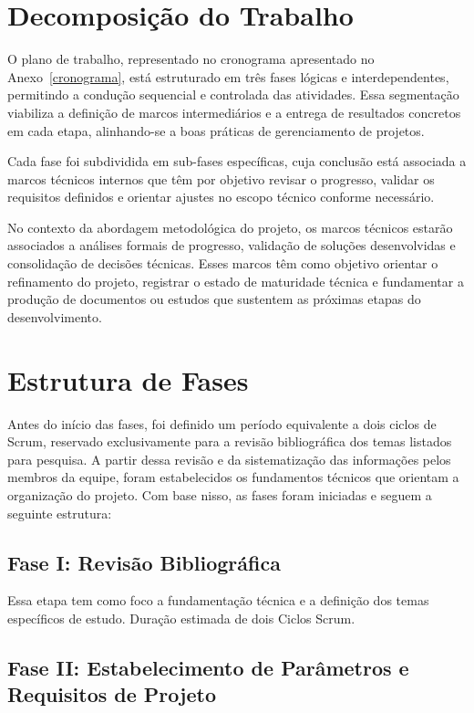 \section{Decomposição do Trabalho}\label{sec:trabalho}
O plano de trabalho, representado no cronograma apresentado no Anexo~\ref{cronograma}, está estruturado em três fases lógicas e interdependentes, permitindo a condução sequencial e controlada das atividades. Essa segmentação viabiliza a definição de marcos intermediários e a entrega de resultados concretos em cada etapa, alinhando-se a boas práticas de gerenciamento de projetos.

Cada fase foi subdividida em sub-fases específicas, cuja conclusão está associada a marcos técnicos internos que têm por objetivo revisar o progresso, validar os requisitos definidos e orientar ajustes no escopo técnico conforme necessário.

No contexto da abordagem metodológica do projeto, os marcos técnicos estarão associados a análises formais de progresso, validação de soluções desenvolvidas e consolidação de decisões técnicas. Esses marcos têm como objetivo orientar o refinamento do projeto, registrar o estado de maturidade técnica e fundamentar a produção de documentos ou estudos que sustentem as próximas etapas do desenvolvimento.


\section{Estrutura de Fases}\label{sec:fases}

Antes do início das fases, foi definido um período equivalente a dois ciclos de Scrum, reservado exclusivamente para a revisão bibliográfica dos temas listados para pesquisa. A partir dessa revisão e da sistematização das informações pelos membros da equipe, foram estabelecidos os fundamentos técnicos que orientam a organização do projeto. Com base nisso, as fases foram iniciadas e seguem a seguinte estrutura:

\subsection{Fase I: Revisão Bibliográfica}
Essa etapa tem como foco a fundamentação técnica e a definição dos temas específicos de estudo. Duração estimada de dois Ciclos Scrum.

\subsection{Fase II: Estabelecimento de Parâmetros e Requisitos de Projeto}

